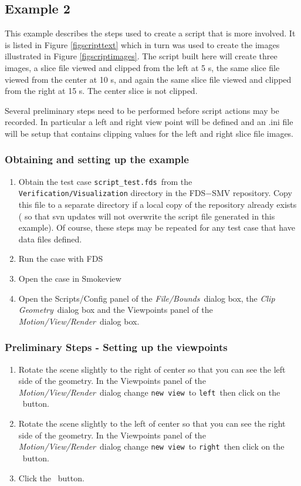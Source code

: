 \documentclass[11pt,twoside]{book}
\newcommand{\frameit}[1]{\fbox{\tt #1}}
\begin{document}
\subsection{Example 2}
This example describes the steps used to create a script that is more involved.
It is listed
in Figure \ref{figscripttext} which in turn was used to
create the images
illustrated in Figure \ref{figscriptimages}.  The script built here
will create three images,
a slice file viewed and clipped from the left at 5 s,
the same slice file viewed from the center at 10 s,
and again the same slice file viewed and clipped from the right at 15 s.
The center slice is not clipped.

Several preliminary steps need to be performed before script actions may be recorded.
In particular a left and right view point will be defined and
an .ini file will be setup that contains clipping values for the
left and right slice file images.

\subsubsection{Obtaining and setting up the example}

\begin{enumerate}
\item Obtain the test case {\tt script\_test.fds}\ from the
    {\tt Verification/Visualization} directory in
the FDS$-$SMV repository.  Copy this file to a separate directory
 if a local copy of the repository already exists
 ( so that svn updates will not overwrite the script file generated in this example).  Of course, these steps may be repeated
 for any test case that have data files defined.
\item Run the case with FDS \item Open the case in Smokeview \item
Open the Scripts/Config panel of the {\em File/Bounds}\ dialog
box, the {\em Clip Geometry}\ dialog box and the Viewpoints panel
of the {\em Motion/View/Render}\ dialog box.
\end{enumerate}

\subsubsection{Preliminary Steps - Setting up the viewpoints}

\begin{enumerate}
\item Rotate the scene slightly to the right of center so that you
can see the left side of the geometry.  In the Viewpoints panel of
the {\em Motion/View/Render}\ dialog change {\tt new view}\ to
{\tt left}\
    then click on the \frameit{Add}\ button.
\item Rotate the scene slightly to the left of center so that you
can see the right side of the geometry.  In the Viewpoints panel
of the {\em Motion/View/Render}\ dialog change {\tt new view}\ to
{\tt right}\
    then click on the \frameit{Add}\ button.
\item Click the \frameit{Save Settings}\ button.
\end{enumerate}
\end{document}

